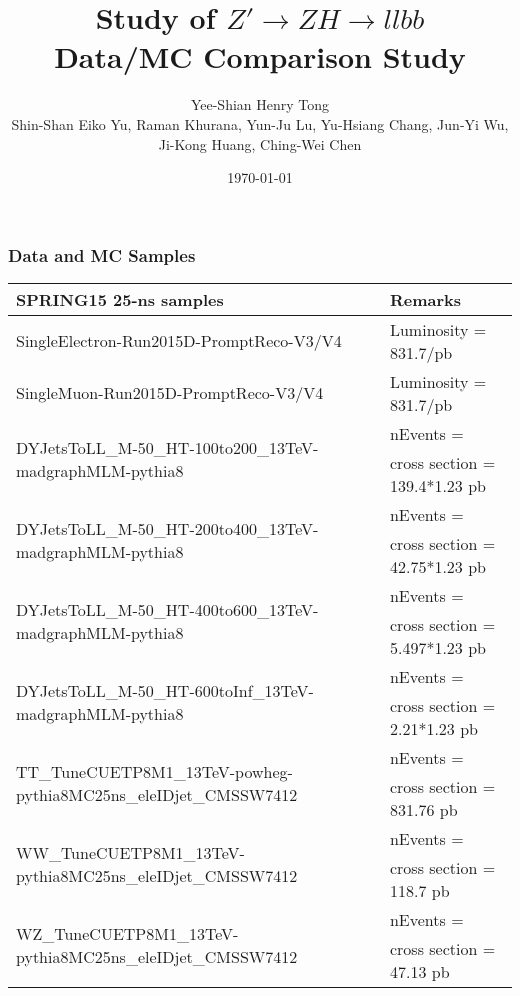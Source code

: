 \documentclass[aspectratio=169]{beamer}
\title[]{\LARGE{Study of $Z' \rightarrow ZH \rightarrow llbb$ \\ Data/MC Comparison Study}} %
\author[Henry Tong]{\Large{Yee-Shian Henry Tong}\\[3mm] \scriptsize{Shin-Shan Eiko Yu, Raman Khurana, Yun-Ju Lu, Yu-Hsiang Chang, Jun-Yi Wu, Ji-Kong Huang, Ching-Wei Chen}} %
\institute[NCU]{ %
  National Central University \\ %
  \medskip
  \textit{Dibosons Resonance Meeting}
}
\date{\today} %
\begin{document}
\begin{frame}
  \vspace*{-1cm}
  \enlargethispage{1cm}
  \titlepage %
\end{frame}



\begin{frame}
  \frametitle{Data and MC Samples}
  \justifying 
  \begin{tiny}
    \begin{center}
      \begin{tabular}{ | l | l | }
        \hline
        \bf SPRING15 25-ns samples & \bf Remarks \\
        \hline
        SingleElectron-Run2015D-PromptReco-V3/V4 & Luminosity = 831.7/pb \\
        \hline
        SingleMuon-Run2015D-PromptReco-V3/V4 & Luminosity = 831.7/pb \\
        \hline
        \multirow{2}{*}{DYJetsToLL\_M-50\_HT-100to200\_13TeV-madgraphMLM-pythia8} & nEvents =  \\
        & cross section = 139.4*1.23 pb \\
        \hline
        \multirow{2}{*}{DYJetsToLL\_M-50\_HT-200to400\_13TeV-madgraphMLM-pythia8} & nEvents =  \\
        & cross section = 42.75*1.23 pb \\
        \hline
        \multirow{2}{*}{DYJetsToLL\_M-50\_HT-400to600\_13TeV-madgraphMLM-pythia8} & nEvents =  \\
        & cross section = 5.497*1.23 pb \\
        \hline
        \multirow{2}{*}{DYJetsToLL\_M-50\_HT-600toInf\_13TeV-madgraphMLM-pythia8} & nEvents =  \\
        & cross section = 2.21*1.23 pb \\
        \hline  
        \multirow{2}{*}{TT\_TuneCUETP8M1\_13TeV-powheg-pythia8MC25ns\_eleIDjet\_CMSSW7412} & nEvents =  \\
        & cross section = 831.76 pb \\
        \hline
        \multirow{2}{*}{WW\_TuneCUETP8M1\_13TeV-pythia8MC25ns\_eleIDjet\_CMSSW7412} & nEvents =  \\
        & cross section = 118.7 pb \\
        \hline
        \multirow{2}{*}{WZ\_TuneCUETP8M1\_13TeV-pythia8MC25ns\_eleIDjet\_CMSSW7412} & nEvents =  \\
        & cross section = 47.13 pb \\

\end{tabular}
\end{center}
\end{tiny}
\end{frame}
\end{document}
